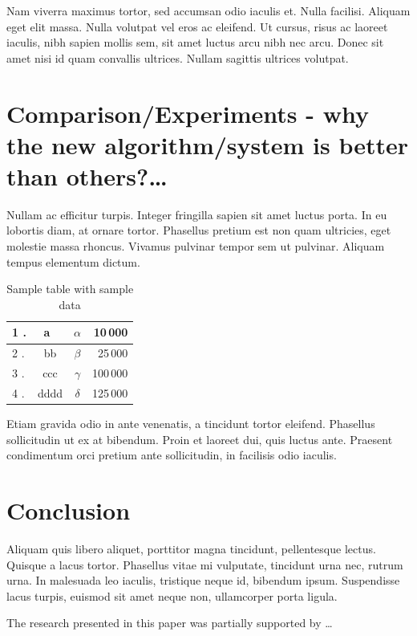 \documentclass[10pt]{article}
\begin{document}
Nam viverra maximus tortor, sed accumsan odio iaculis et. Nulla facilisi. Aliquam eget elit massa. Nulla volutpat vel eros ac eleifend. Ut cursus, risus ac laoreet iaculis, nibh sapien mollis sem, sit amet luctus arcu nibh nec arcu. Donec sit amet nisi id quam convallis ultrices. Nullam sagittis ultrices volutpat. 

\section{Comparison/Experiments - why the new algorithm/system is better than others?\ldots}

Nullam ac efficitur turpis. Integer fringilla sapien sit amet luctus porta. In eu lobortis diam, at ornare tortor. Phasellus pretium est non quam ultricies, eget molestie massa rhoncus. Vivamus pulvinar tempor sem ut pulvinar. Aliquam tempus elementum dictum.

\begin{table}[!ht]
\centering
\caption{Sample table with sample data}
\label{tabl.1}
  \begin{tabular}{|l<{.}|c|>{$}c<{$}|r|}
                                 \hline
   1 & a~   & \alpha &  10\,000\\\hline
   2 & bb   & \beta  &  25\,000\\\hline
   3 & ccc  & \gamma & 100\,000\\\hline
   4 & dddd & \delta & 125\,000\\\hline
  \end{tabular}
\end{table}

Etiam gravida odio in ante venenatis, a tincidunt tortor eleifend. Phasellus sollicitudin ut ex at bibendum. Proin et laoreet dui, quis luctus ante. Praesent condimentum orci pretium ante sollicitudin, in facilisis odio iaculis. 

\section{Conclusion}

Aliquam quis libero aliquet, porttitor magna tincidunt, pellentesque lectus. Quisque a lacus tortor. Phasellus vitae mi vulputate, tincidunt urna nec, rutrum urna. In malesuada leo iaculis, tristique neque id, bibendum ipsum. Suspendisse lacus turpis, euismod sit amet neque non, ullamcorper porta ligula.

\begin{acknowledgements}
 The research presented in this paper was partially supported by \ldots
\end{acknowledgements}





\end{document}
